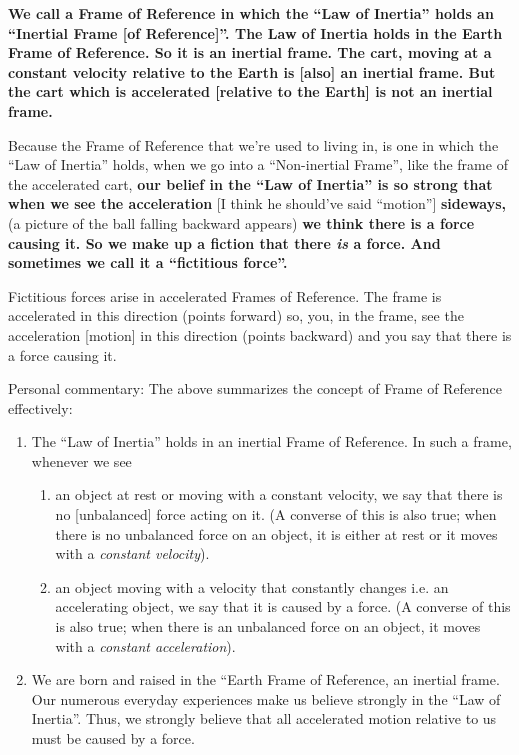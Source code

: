 \documentclass[a6paper]{article}
\begin{document}
\textbf{We call a Frame of Reference in which the ``Law of Inertia'' holds an ``Inertial Frame [of Reference]''. The Law of Inertia holds in the Earth Frame of Reference. So it is an inertial frame. The cart, moving at a constant velocity relative to the Earth is [also] an inertial frame. But the cart which is accelerated [relative to the Earth] is not an inertial frame.}

Because the Frame of Reference that we're used to living in, is one in which the ``Law of Inertia'' holds, when we go into a ``Non-inertial Frame'', like the frame of the accelerated cart, \textbf{our belief in the ``Law of Inertia'' is so strong that when we see the acceleration} [I think he should've said ``motion''] \textbf{sideways,} (a picture of the ball falling backward appears) \textbf{we think there is a force causing it. So we make up a fiction that there \emph{is} a force. And sometimes we call it a ``fictitious force''.}

Fictitious forces arise in accelerated Frames of Reference. The frame is accelerated in this direction (points forward) so, you, in the frame, see the acceleration [motion] in this direction (points backward) and you say that there is a force causing it. 

Personal commentary: The above summarizes the concept of Frame of Reference effectively:
\begin{enumerate}
    \item The ``Law of Inertia'' holds in an inertial Frame of Reference. In such a frame, whenever we see 
        \begin{enumerate} 
            \item an object at rest or moving with a constant velocity, we say that there is no [unbalanced] force acting on it. (A converse of this is also true; when there is no unbalanced force on an object, it is either at rest or it moves with a \emph{constant velocity}).
            \item an object moving with a velocity that constantly changes i.e. an accelerating object, we say that it is caused by a force. (A converse of this is also true; when there is an unbalanced force on an object, it moves with a \emph{constant acceleration}).
        \end{enumerate}
    \item We are born and raised in the ``Earth Frame of Reference, an inertial frame. Our numerous everyday experiences make us believe strongly in the ``Law of Inertia''. Thus, we strongly believe that all accelerated motion relative to us must be caused by a force. 
\end{enumerate}
\end{document}
